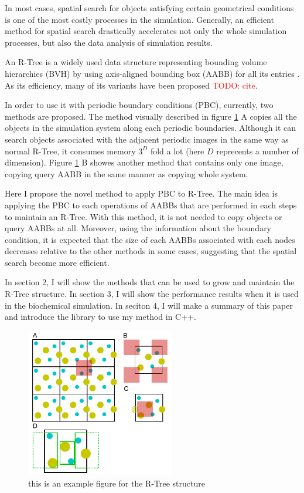 \documentclass[10pt,letterpaper,twocolumn]{article}
\begin{document}
In most cases, spatial search for objects satisfying certain geometrical
conditions is one of the most costly processes in the simulation. Generally, an
efficient method for spatial search drastically accelerates not only the whole
simulation processes, but also the data analysis of simulation results.

An R-Tree is a widely used data structure representing bounding volume
hierarchies (BVH) by using axis-aligned bounding box (AABB) for all its entries
\cite{Guttman1984}. As its efficiency, many of its variants have been proposed
\textcolor{red}{TODO: cite}.

In order to use it with periodic boundary conditions (PBC), currently,
two methods are proposed\cite{CoSTR-R-tree2016}. The method visually described in
figure \ref{fig1} A copies all the objects in the simulation system
along each periodic boundaries. Although it can search objects associated with
the adjacent periodic images in the same way as normal R-Tree, it consumes
memory $3^D$ fold a lot (here $D$ reprecents a number of dimension). Figure
\ref{fig1} B showes another method that contains only one image,
copying query AABB in the same manner as copying whole system.

Here I propose the novel method to apply PBC to R-Tree. The main idea is
applying the PBC to each operations of AABBs that are performed in each steps to
maintain an R-Tree. With this method, it is not needed to copy objects or query
AABBs at all. Moreover, using the information about the boundary condition,
it is expected that the size of each AABBs associated with each nodes decreases
relative to the other methods in some cases, suggesting that the spatial search
become more efficient.

In section 2, I will show the methods that can be used to
grow and maintain the R-Tree structure. In section 3, I will show the performance
results when it is used in the biochemical simulation. In seciton 4, I will make
a summary of this paper and introduce the library to use my method in C++.

\begin{figure}[hbt]
    \includegraphics[width=6.5cm, bb=0 0 567 567]{fig1.eps}
    \caption{this is an example figure for the R-Tree structure}
    \label{fig1}
\end{figure}
\end{document}
